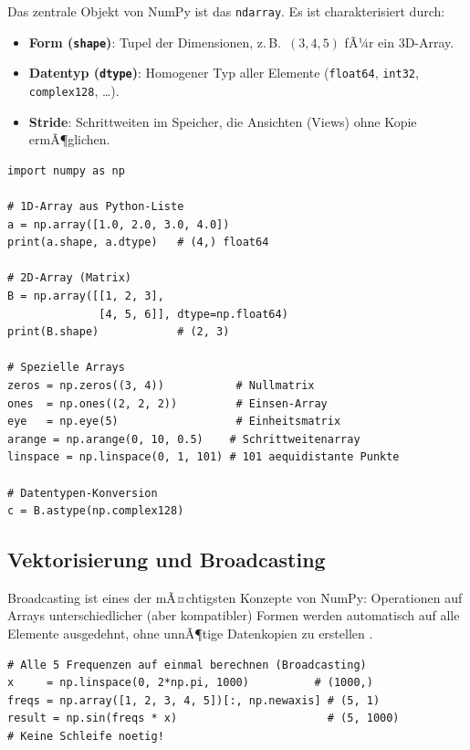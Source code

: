 \documentclass[12pt, a4paper]{article}
\begin{document}
Das zentrale Objekt von NumPy ist das \texttt{ndarray}. Es ist
charakterisiert durch:

\begin{itemize}
  \item \textbf{Form (\texttt{shape})}: Tupel der Dimensionen, z.\,B.\ $(3, 4, 5)$ fÃ¼r ein 3D-Array.
  \item \textbf{Datentyp (\texttt{dtype})}: Homogener Typ aller Elemente (\texttt{float64}, \texttt{int32}, \texttt{complex128}, \ldots).
  \item \textbf{Stride}: Schrittweiten im Speicher, die Ansichten (Views) ohne Kopie ermÃ¶glichen.
\end{itemize}

\begin{lstlisting}[caption={Erstellen und Inspizieren von NumPy-Arrays}]
import numpy as np

# 1D-Array aus Python-Liste
a = np.array([1.0, 2.0, 3.0, 4.0])
print(a.shape, a.dtype)   # (4,) float64

# 2D-Array (Matrix)
B = np.array([[1, 2, 3],
              [4, 5, 6]], dtype=np.float64)
print(B.shape)            # (2, 3)

# Spezielle Arrays
zeros = np.zeros((3, 4))           # Nullmatrix
ones  = np.ones((2, 2, 2))         # Einsen-Array
eye   = np.eye(5)                  # Einheitsmatrix
arange = np.arange(0, 10, 0.5)    # Schrittweitenarray
linspace = np.linspace(0, 1, 101) # 101 aequidistante Punkte

# Datentypen-Konversion
c = B.astype(np.complex128)
\end{lstlisting}

\subsection{Vektorisierung und Broadcasting}
\label{subsec:numpy-broadcast}

Broadcasting ist eines der mÃ¤chtigsten Konzepte von NumPy: Operationen
auf Arrays unterschiedlicher (aber kompatibler) Formen werden automatisch
auf alle Elemente ausgedehnt, ohne unnÃ¶tige Datenkopien zu erstellen
\cite{vanderplas2016python}.

\begin{lstlisting}[caption={Broadcasting: Elementweise Operationen}]
# Alle 5 Frequenzen auf einmal berechnen (Broadcasting)
x     = np.linspace(0, 2*np.pi, 1000)          # (1000,)
freqs = np.array([1, 2, 3, 4, 5])[:, np.newaxis] # (5, 1)
result = np.sin(freqs * x)                       # (5, 1000)
# Keine Schleife noetig!
\end{lstlisting}
\end{document}
